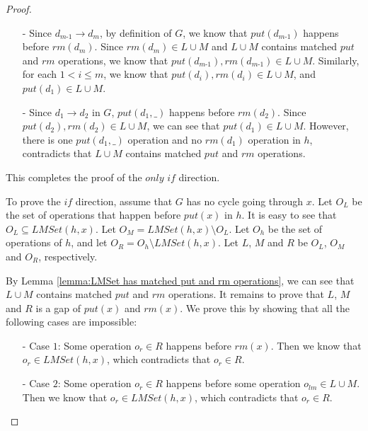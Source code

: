 \begin {proof}
\begin{itemize}
\setlength{\itemsep}{0.5pt}
\item[-] Since $d_{\textit{m-1}} \rightarrow d_m$, by definition of $G$, we know that $\textit{put}(d_{\textit{m-1}})$ happens before $\textit{rm}(d_m)$. Since $\textit{rm}(d_m) \in L \cup M$ and $L \cup M$ contains matched $\textit{put}$ and $\textit{rm}$ operations, we know that $\textit{put}(d_{\textit{m-1}}),\textit{rm}(d_{\textit{m-1}}) \in L \cup M$. Similarly, for each $1 < i \leq m$, we know that $\textit{put}(d_i),\textit{rm}(d_i) \in L \cup M$, and $\textit{put}(d_1)\in L \cup M$.

\item[-] Since $d_1 \rightarrow d_2$ in $G$, $\textit{put}(d_1,\_)$ happens before $\textit{rm}(d_2)$. Since $\textit{put}(d_2),\textit{rm}(d_2) \in L \cup M$, we can see that $\textit{put}(d_1) \in L \cup M$. However, there is one $\textit{put}(d_1,\_)$ operation and no $\textit{rm}(d_1)$ operation in $h$, contradicts that $L \cup M$ contains matched $\textit{put}$ and $\textit{rm}$ operations.
\end{itemize}


This completes the proof of the $\textit{only if}$ direction.

To prove the $\textit{if}$ direction, assume that $G$ has no cycle going through $x$. Let $O_L$ be the set of operations that happen before $\textit{put}(x)$ in $h$. It is easy to see that $O_L \subseteq \textit{LMSet}(h,x)$. Let $O_M = \textit{LMSet}(h,x) \setminus O_L$. Let $O_h$ be the set of operations of $h$, and let $O_R = O_h \setminus \textit{LMSet}(h,x)$. Let $L$, $M$ and $R$ be $O_L$, $O_M$ and $O_R$, respectively.

By Lemma \ref{lemma:LMSet has matched put and rm operations}, we can see that $L \cup M$ contains matched $\textit{put}$ and $\textit{rm}$ operations. It remains to prove that $L$, $M$ and $R$ is a gap of $\textit{put}(x)$ and $\textit{rm}(x)$. We prove this by showing that all the following cases are impossible:

\begin{itemize}
\setlength{\itemsep}{0.5pt}
\item[-] Case $1$: Some operation $o_r \in R$ happens before $\textit{rm}(x)$. Then we know that $o_r \in \textit{LMSet}(h,x)$, which contradicts that $o_r \in R$.

\item[-] Case $2$: Some operation $o_r \in R$ happens before some operation $o_{lm} \in L \cup M$. Then we know that $o_r \in \textit{LMSet}(h,x)$, which contradicts that $o_r \in R$.


\end{itemize}
\end{proof}
